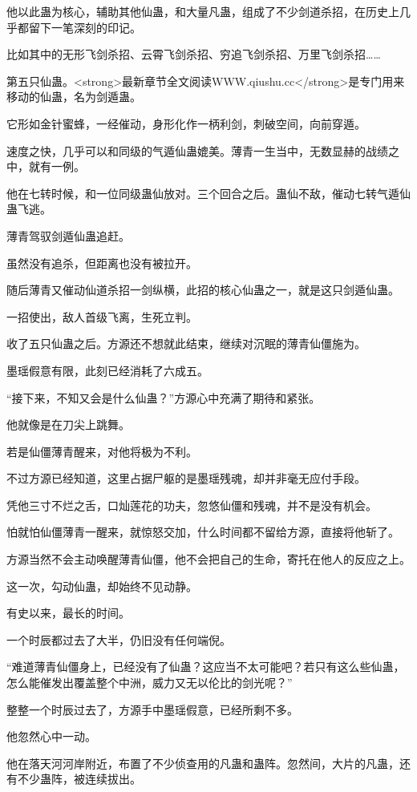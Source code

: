 \begin{this_body}
他以此蛊为核心，辅助其他仙蛊，和大量凡蛊，组成了不少剑道杀招，在历史上几乎都留下一笔深刻的印记。

比如其中的无形飞剑杀招、云霄飞剑杀招、穷追飞剑杀招、万里飞剑杀招……

第五只仙蛊。<strong>最新章节全文阅读WWW.qiushu.cc</strong>是专门用来移动的仙蛊，名为剑遁蛊。

它形如金针蜜蜂，一经催动，身形化作一柄利剑，刺破空间，向前穿遁。

速度之快，几乎可以和同级的气遁仙蛊媲美。薄青一生当中，无数显赫的战绩之中，就有一例。

他在七转时候，和一位同级蛊仙放对。三个回合之后。蛊仙不敌，催动七转气遁仙蛊飞逃。

薄青驾驭剑遁仙蛊追赶。

虽然没有追杀，但距离也没有被拉开。

随后薄青又催动仙道杀招一剑纵横，此招的核心仙蛊之一，就是这只剑遁仙蛊。

一招使出，敌人首级飞离，生死立判。

收了五只仙蛊之后。方源还不想就此结束，继续对沉眠的薄青仙僵施为。

墨瑶假意有限，此刻已经消耗了六成五。

“接下来，不知又会是什么仙蛊？”方源心中充满了期待和紧张。

他就像是在刀尖上跳舞。

若是仙僵薄青醒来，对他将极为不利。

不过方源已经知道，这里占据尸躯的是墨瑶残魂，却并非毫无应付手段。

凭他三寸不烂之舌，口灿莲花的功夫，忽悠仙僵和残魂，并不是没有机会。

怕就怕仙僵薄青一醒来，就惊怒交加，什么时间都不留给方源，直接将他斩了。

方源当然不会主动唤醒薄青仙僵，他不会把自己的生命，寄托在他人的反应之上。

这一次，勾动仙蛊，却始终不见动静。

有史以来，最长的时间。

一个时辰都过去了大半，仍旧没有任何端倪。

“难道薄青仙僵身上，已经没有了仙蛊？这应当不太可能吧？若只有这么些仙蛊，怎么能催发出覆盖整个中洲，威力又无以伦比的剑光呢？”

整整一个时辰过去了，方源手中墨瑶假意，已经所剩不多。

他忽然心中一动。

他在落天河河岸附近，布置了不少侦查用的凡蛊和蛊阵。忽然间，大片的凡蛊，还有不少蛊阵，被连续拔出。


\end{this_body}
